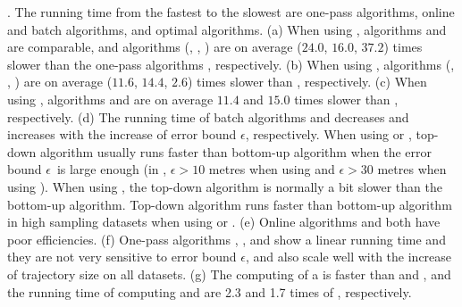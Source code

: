 \emph{}. The running time from the fastest to the slowest are one-pass algorithms, online and batch algorithms, and optimal algorithms.
(a) When using \ped, algorithms \siped and \operb are comparable, and algorithms
(\tpa, \dpa, \bqsa) are on average ($24.0$, $16.0$, $37.2$) times slower than the one-pass algorithms \siped, respectively.
(b) When using \sed, algorithms (\tpa, \dpa, \squishe) are on average ($11.6$, $14.4$, $2.6$) times slower than \cised, respectively.
(c) When using \dad, algorithms \tpa and \dpa are on average
$11.4$ and $15.0$ times slower than \ridad, respectively.
(d) The running time of batch algorithms \dpa and \tpa decreases and increases with the increase of error bound $\epsilon$, respectively. When using \ped or \sed, top-down algorithm \dpa usually runs faster than bottom-up algorithm \tpa when the error bound $\epsilon$~is large enough (\eg in \geolife, $\epsilon >10$ metres when using \ped and $\epsilon >30$ metres when using \sed). When using \dad, the top-down algorithm is normally a bit slower than the bottom-up algorithm.
Top-down algorithm runs faster than bottom-up algorithm in high sampling datasets when using \ped or \sed.
(e) Online algorithms \bqsa and \opwa both have poor efficiencies.
(f) One-pass algorithms \operb, \siped, \cised and \ridad show a linear running time and they are not very sensitive to error bound $\epsilon$, and also scale well with the increase of trajectory size on all datasets.
(g) The computing of a \dad is faster than \ped and \sed, and the running time of computing \ped and \sed are 2.3 and 1.7 times of \dad, respectively.












